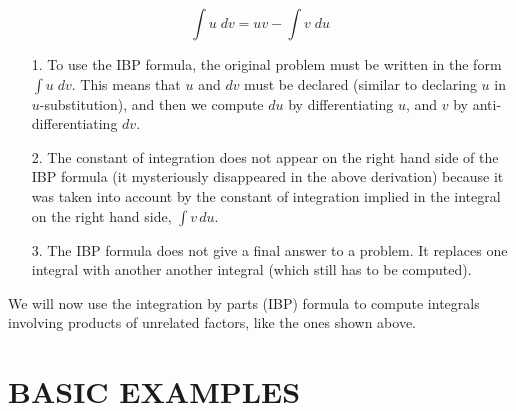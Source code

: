 \documentclass{ximera}
\begin{document}
\begin{theorem}
\[
\int u \; dv = uv - \int v \; du
\]
\end{theorem}

\begin{remark}
\begin{enumerate}
\item[1.] To use the IBP formula, the original problem must be written in the form $\int u \; dv$. This means that $u$ and $dv$
must be declared (similar to declaring $u$ in $u$-substitution), and then we compute $du$ by differentiating $u$, and $v$ by anti-differentiating $dv$.
\item[2.] The constant of integration does not appear on the right hand side of the IBP formula
(it mysteriously disappeared in the above derivation) because it was taken into account by the constant of integration implied in 
the integral on the right hand side, $\int v \,du$.
\item[3.] The IBP formula does not give a final answer to a problem. 
It replaces one integral with another another integral (which still has to be computed).
\end{enumerate}
\end{remark}

We will now use the integration by parts (IBP) formula to compute integrals involving products of unrelated factors, like the ones
shown above. 

\section{BASIC EXAMPLES}
\end{document}
